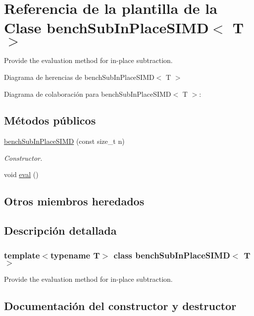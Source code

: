 \hypertarget{classbenchSubInPlaceSIMD}{}\section{Referencia de la plantilla de la Clase bench\+Sub\+In\+Place\+S\+I\+MD$<$ T $>$}
\label{classbenchSubInPlaceSIMD}


Provide the evaluation method for in-\/place subtraction.  




Diagrama de herencias de bench\+Sub\+In\+Place\+S\+I\+MD$<$ T $>$


Diagrama de colaboración para bench\+Sub\+In\+Place\+S\+I\+MD$<$ T $>$\+:
\subsection*{Métodos públicos}
\begin{DoxyCompactItemize}
\item 
\hyperlink{classbenchSubInPlaceSIMD_af0329ba29f40b807470fa11dccd1e7fa}{bench\+Sub\+In\+Place\+S\+I\+MD} (const size\+\_\+t n)
\begin{DoxyCompactList}\small\item\em Constructor. \end{DoxyCompactList}\item 
void \hyperlink{classbenchSubInPlaceSIMD_a1a00a92a8592c8baa781cf377f6d63be}{eval} ()
\end{DoxyCompactItemize}
\subsection*{Otros miembros heredados}


\subsection{Descripción detallada}
\subsubsection*{template$<$typename T$>$\newline
class bench\+Sub\+In\+Place\+S\+I\+M\+D$<$ T $>$}

Provide the evaluation method for in-\/place subtraction. 

\subsection{Documentación del constructor y destructor}
\mbox{\label{classbenchSubInPlaceSIMD_af0329ba29f40b807470fa11dccd1e7fa}} 
